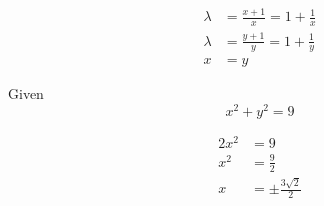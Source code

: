       \begin{align*}
        \lambda &= \frac{x + 1}{x} = 1 + \frac{1}{x} \\
        \lambda &= \frac{y + 1}{y} = 1 + \frac{1}{y} \\
        x &= y
      \end{align*}

      Given
      \begin{displaymath}
        x^{2} + y^{2} = 9
      \end{displaymath}

      \begin{align*}
        2x^{2} &= 9 \\
        x^{2} &= \frac{9}{2} \\
        x &= \pm \frac{3\sqrt{2}}{2}
      \end{align*}